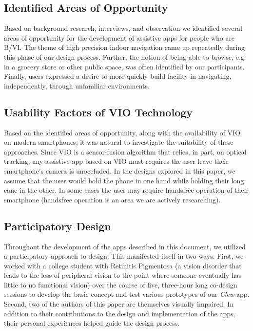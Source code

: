 \documentclass[chi_draft]{sigchi}
\newcommand{\BVI}{B/VI\xspace}
\begin{document}
\subsection{Identified Areas of Opportunity}
Based on background research, interviews, and observation we identified several areas of opportunity for the development of assistive apps for people who are \BVI.  The theme of high precision  indoor navigation came up repeatedly during this phase of our design process.  Further, the notion of being able to browse, e.g. in a grocery store or other public space, was often identified by our participants.  Finally, users expressed a desire to more quickly build facility in navigating, independently, through unfamiliar environments.

\subsection{Usability Factors of VIO Technology}
Based on the identified areas of opportunity, along with the availability of VIO on modern smartphones, it was natural to investigate the suitability of these approaches.  Since VIO is a sensor-fusion algorithm that relies, in part, on optical tracking, any assistive app based on VIO must requires the user leave their smartphone's camera is unoccluded.  In the designs explored in this paper, we assume that the user would hold the phone in one hand while holding their long cane in the other.  In some cases the user may require handsfree operation of their smartphone (handsfree operation is an area we are actively researching).

\subsection{Participatory Design}

Throughout the development of the apps described in this document, we utilized a participatory approach to design.  This manifested itself in two ways.  First, we worked with a college student with Retinitis Pigmentosa (a vision disorder that leads to the loss of peripheral vision to the point where someone eventually has little to no functional vision) over the course of five, three-hour long co-design sessions to develop the basic concept and test various prototypes of our \emph{Clew} app.   Second, two of the authors of this paper are themselves visually impaired.  In addition to their contributions to the design and implementation of the apps, their personal experiences helped guide the design process.
\end{document}

